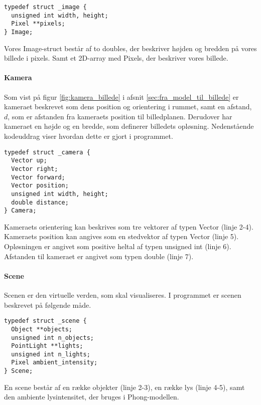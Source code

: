 \begin{lstlisting}[style=Cstyle, caption=Struct til Image]
typedef struct _image {
  unsigned int width, height;
  Pixel **pixels;
} Image;
\end{lstlisting}

Vores Image-struct består af to doubles, der beskriver højden og bredden på vores billede i pixels. Samt et 2D-array med Pixels, der beskriver vores billede.

\paragraph{Kamera}
Som vist på figur \ref{fig:kamera_billede} i afsnit \ref{sec:fra_model_til_billede} er kameraet beskrevet som dens position og orientering i rummet, samt en afstand, $d$, som er afstanden fra kameraets position til billedplanen. Derudover har kameraet en højde og en bredde, som definerer billedets opløsning. Nedenstående kodeuddrag viser hvordan dette er gjort i programmet.

\begin{lstlisting}[style=Cstyle, caption=Struct til kamera]
typedef struct _camera {
  Vector up;
  Vector right;
  Vector forward;
  Vector position;
  unsigned int width, height;
  double distance;
} Camera;
\end{lstlisting}

Kameraets orientering kan beskrives som tre vektorer af typen Vector (linje 2-4). Kameraets position kan angives som en stedvektor af typen Vector (linje 5). Opløsningen er angivet som positive heltal af typen unsigned int (linje 6). Afstanden til kameraet er angivet som typen double (linje 7).

\paragraph{Scene}
Scenen er den virtuelle verden, som skal visualiseres. I programmet er scenen beskrevet på følgende måde. 

\begin{lstlisting}[style=Cstyle, caption=Struct til scene]
typedef struct _scene {
  Object **objects;
  unsigned int n_objects;
  PointLight **lights;
  unsigned int n_lights;
  Pixel ambient_intensity;
} Scene; 
\end{lstlisting}

En scene består af en række objekter (linje 2-3), en række lys (linje 4-5), samt den ambiente lysintensitet, der bruges i Phong-modellen.

